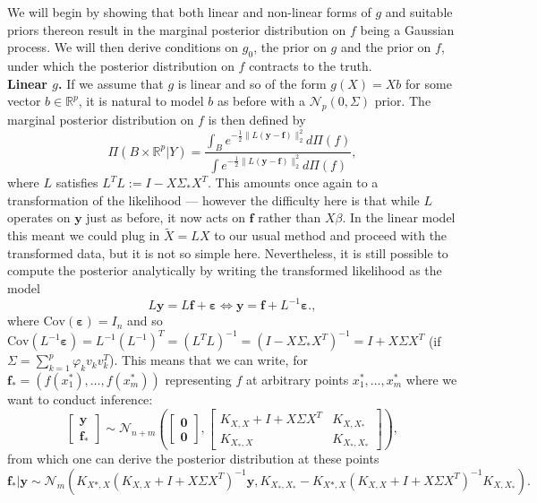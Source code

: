 \documentclass[11pt]{article}
\newcommand{\subparspace}{\vspace{3mm} \\}
\newcommand{\eps}{\varepsilon}
\newcommand{\R}{\mathbb{R}}
\newcommand{\cov}{\textrm{Cov}}
\numberwithin{equation}{section}
\begin{document}
 We will begin by showing that both linear and non-linear forms of $g$ and suitable priors thereon result in the marginal posterior distribution on $f$ being a Gaussian process. We will then derive conditions on $g_0$, the prior on $g$ and the prior on $f$, under which the posterior distribution on $f$ contracts to the truth.
 \subparspace
{\bf Linear $g$.}
If we assume that $g$ is linear and so of the form $g(X) = X b$ for some vector $b \in \R^p$, it is natural to model $b$ as before with a $\mathcal{N}_p(0, \Sigma)$ prior. The marginal posterior distribution on $f$ is then defined by
$$
\Pi(B \times \R^p | Y) = \frac{\int_B e^{-\frac{1}{2}\|L(\mathbf{y} - \mathbf{f})\|_2^2} d\Pi(f)}{\int e^{-\frac{1}{2}\|L(\mathbf{y} - \mathbf{f})\|_2^2} d\Pi(f)},
$$
where $L$ satisfies $L^TL := I - X\Sigma_* X^T$. This amounts once again to a transformation of the likelihood --- however the difficulty here is that while $L$ operates on $\mathbf{y}$ just as before, it now acts on $\mathbf{f}$ rather than $X\beta$. In the linear model this meant we could plug in $\tilde{X} = LX$ to our usual method and proceed with the transformed data, but it is not so simple here. Nevertheless, it is still possible to compute the posterior analytically by writing the transformed likelihood as the model 
$$
L\mathbf{y} = L\mathbf{f} + \boldsymbol{\eps} \Leftrightarrow \mathbf{y} = \mathbf{f} + L^{-1}\boldsymbol{\eps}.,
$$
where $\cov(\boldsymbol{\eps}) = I_n$ and so $\cov(L^{-1}\boldsymbol{\eps}) = L^{-1}(L^{-1})^T = (L^T L)^{-1} = (I - X\Sigma_*X^T)^{-1} = I + X\Sigma X^T $ (if $\Sigma = \sum_{k=1}^p \varphi_k v_k v_k^T$). This means that we can write, for $\mathbf{f}_* = (f(x_1^*), \dots, f(x_m^*))$ representing $f$ at arbitrary points $x_1^*, \dots, x_m^*$ where we want to conduct inference:
$$
\left[\begin{matrix}
	\mathbf{y} \\ \mathbf{f_*}
\end{matrix} \right]
\sim \mathcal{N}_{n + m} \left( 
\left[\begin{matrix}
\mathbf{0} \\ \mathbf{0}	
\end{matrix} \right]
, 
\left[\begin{matrix}
K_{X, X} + I + X\Sigma X^T & K_{X, X_*} \\ 
K_{X_*, X} & K_{X_*, X_*}
\end{matrix} \right]
 \right),
$$
from which one can derive the posterior distribution at these points
$$
\mathbf{f_*} | \mathbf{y} \sim \mathcal{N}_m \left(
K_{X*, X}(K_{X, X} + I + X\Sigma X^T)^{-1} \mathbf{y}, K_{X_*, X_*} - K_{X*, X}(K_{X, X} + I + X\Sigma X^T)^{-1}K_{X, X_*}
\right).
$$
\end{document}
